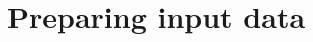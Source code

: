 \documentclass{article}
\def\spades{SPAdes}
\def\bh{BayesHammer}
\begin{document}
\section{Preparing input data}
%
%
\end{document}
